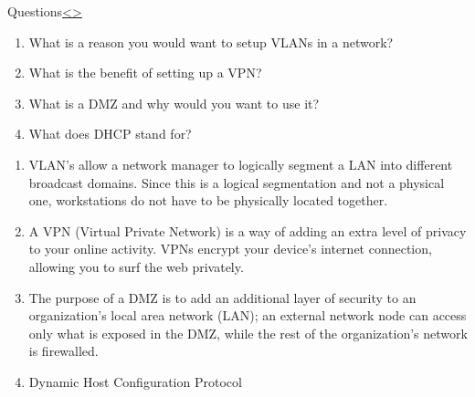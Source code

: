 \documentclass[12pt]{article}
\newenvironment{instructionblock}{\Large\bgroup}{\egroup}
\begin{document}
\pagebreak
\begin{slide}{Questions}{\hyperref[slide 5]{\textless}\hyperref[slide 7]{\textgreater}}
	\begin{instructionblock}
    \begin{enumerate}
    \item What is a reason you would want to setup VLANs in a network?
    \item What is the benefit of setting up a VPN?
    \item What is a DMZ and why would you want to use it?
    \item What does DHCP stand for?
    \end{enumerate}		
	\end{instructionblock}
\end{slide}
\begin{enumerate}
\item VLAN's allow a network manager to logically segment a LAN into different broadcast domains. Since this is a logical segmentation and not a physical one, workstations do not have to be physically located together.
\item A VPN (Virtual Private Network) is a way of adding an extra level of privacy to your online activity. VPNs encrypt your device’s internet connection, allowing you to surf the web privately.
\item The purpose of a DMZ is to add an additional layer of security to an organization's local area network (LAN); an external network node can access only what is exposed in the DMZ, while the rest of the organization's network is firewalled.
\item Dynamic Host Configuration Protocol
\end{enumerate}
\end{document}
